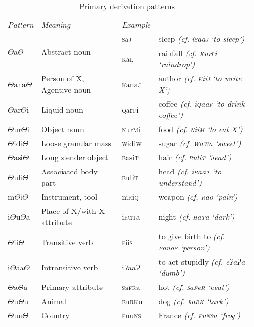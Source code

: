 \documentclass[a4paper,10pt,twoside,openright]{memoir}
\newcommand{\rootpart}{$\Theta$}
\newcommand{\bigglot}{Ɂ}
\begin{document}
\begin{table}[ht]
    \centering
    \begin{tabular}{llll}
    \textit{Pattern} & \textit{Meaning} & \textit{Example} & \\
    \multirow{2}{*}{{\rootpart}a{\rootpart}} & \multirow{2}{*}{Abstract noun}& \textsc{s}a\textsc{j} & sleep \emph{(cf. i\textsc{s}aa\textsc{j} `to sleep')}\\
    & & \textsc{k}a\textsc{l} & rainfall \emph{(cf. \textsc{k}ur\textsc{l}i `raindrop')}\\
    {\rootpart}ana{\rootpart} & Person of X, Agentive noun & \textsc{k}ana\textsc{j} & author \emph{(cf. \textsc{k}ii\textsc{j} `to write X')}\\
    {\rootpart}ar{\rootpart}i & Liquid noun & \textsc{q}ar\textsc{f}i & coffee \emph{(cf. i\textsc{q}aa\textsc{f} `to drink coffee')} \\
    {\rootpart}ur{\rootpart}i & Object noun & \textsc{n}ur\textsc{m}i & food \emph{(cf. \textsc{n}ii\textsc{m} `to eat X')}\\
    {\rootpart}idi{\rootpart} & Loose granular mass & \textsc{w}idi\textsc{w} & sugar \emph{(cf. \textsc{w}a\textsc{w}a `sweet')} \\
    {\rootpart}asi{\rootpart} & Long slender object & \textsc{b}asi\textsc{t} & hair \emph{(cf. \textsc{b}uli\textsc{t} `head')} \\
    {\rootpart}uli{\rootpart} & Associated body part & \textsc{b}uli\textsc{t} & head \emph{(cf. i\textsc{b}aa\textsc{t} `to understand')}\\
    m{\rootpart}i{\rootpart} & Instrument, tool & m\textsc{r}i\textsc{q} & weapon \emph{(cf. \textsc{r}a\textsc{q} `pain')} \\
    i{\rootpart}u{\rootpart}a & Place of X/with X attribute & i\textsc{h}u\textsc{t}a & night \emph{(cf. \textsc{h}a\textsc{t}a `dark')} \\
    {\rootpart}ii{\rootpart} & Transitive verb & \textsc{f}ii\textsc{s} & to give birth to \emph{(cf. \textsc{f}ana\textsc{s} `person')} \\
    i{\rootpart}aa{\rootpart} & Intransitive verb & i\bigglot aa\bigglot & to act stupidly \emph{(cf. e\bigglot a\bigglot a `dumb')} \\
    {\rootpart}a{\rootpart}a & Primary attribute & \textsc{s}a\textsc{fr}a & hot \emph{(cf. \textsc{s}a\textsc{f}e\textsc{r} `heat')} \\
    {\rootpart}u{\rootpart}u & Animal & \textsc{b}u\textsc{rk}u & dog \emph{(cf. \textsc{b}a\textsc{rk} `bark')} \\
    {\rootpart}uu{\rootpart} & Country & \textsc{f}uu\textsc{ns} & France \emph{(cf. \textsc{f}u\textsc{ns}u `frog')}
    
    \end{tabular}
    \caption{Primary derivation patterns}
    \label{tab:primedevs}
\end{table}
\end{document}
